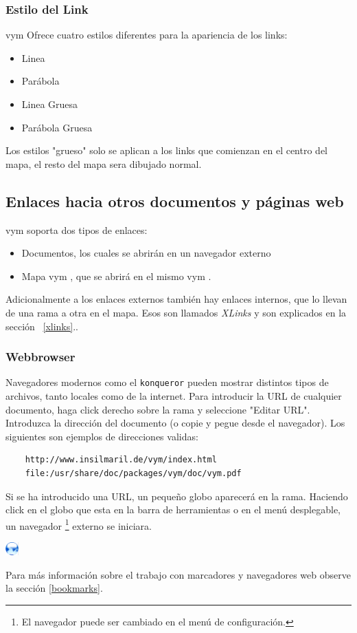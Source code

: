 \documentclass{article}
\newcommand{\vym}{{\sc vym }}
\begin{document}
\subsubsection*{Estilo del Link}
\vym Ofrece cuatro estilos diferentes para la apariencia de los links:
\begin{itemize}
    \item Linea
    \item Par\'abola
    \item Linea Gruesa
    \item Par\'abola Gruesa
    
\end{itemize}
Los estilos "grueso" solo se aplican a los links que comienzan en el centro del mapa, el resto del mapa sera dibujado normal.


\subsection{Enlaces hacia otros documentos y p\'aginas web}
\vym soporta dos tipos de enlaces:
\begin{itemize}
    \item Documentos, los cuales se abrir\'an en un navegador externo
    \item Mapa \vym, que se abrir\'a en el mismo \vym.
\end{itemize}
Adicionalmente a los enlaces externos tambi\'en hay enlaces internos, que lo llevan de una rama a otra en el mapa. Esos son llamados {\em XLinks} y son explicados en la secci\'on ~\ref{xlinks}..

\subsubsection*{Webbrowser}
Navegadores modernos como el {\tt konqueror} pueden mostrar distintos tipos de archivos, tanto locales como de la internet. Para introducir la URL de cualquier documento, haga click derecho sobre la rama y seleccione "Editar URL". Introduzca la direcci\'on del documento (o copie y pegue desde el navegador). Los siguientes son ejemplos de direcciones validas:
\begin{verbatim}
    http://www.insilmaril.de/vym/index.html
    file:/usr/share/doc/packages/vym/doc/vym.pdf
\end{verbatim}
Si se ha introducido una URL, un peque\~no globo aparecer\'a en la rama. Haciendo click en el globo que esta en la barra de herramientas o en el men\'u desplegable, un navegador \footnote{
    El navegador puede ser cambiado en el men\'u de configuraci\'on.}
externo se iniciara.
\begin{center}
    \includegraphics[width=0.5cm]{images/flag-url.png}
\end{center}
Para m\'as informaci\'on sobre el trabajo con marcadores y navegadores web observe la secci\'on \ref{bookmarks}.
\end{document}
